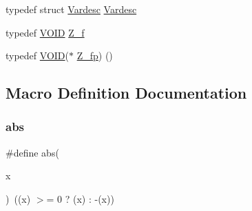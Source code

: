 \begin{DoxyCompactItemize}
\item 
typedef struct \hyperlink{struct_vardesc}{Vardesc} \hyperlink{dependencies_2third-party_2clapack_23_82_81_2_i_n_c_l_u_d_e_2f2c_8h_a6a5a1e20b9e8f87521f7629f97731e4f}{Vardesc}
\item 
typedef \hyperlink{include_2f2c_8h_a7f319bfc2492a2136964194204e7a8cf}{V\+O\+ID} \hyperlink{dependencies_2third-party_2clapack_23_82_81_2_i_n_c_l_u_d_e_2f2c_8h_a79ffb40adc43a2a6473eaacdb4a37718}{Z\+\_\+f}
\item 
typedef \hyperlink{include_2f2c_8h_a7f319bfc2492a2136964194204e7a8cf}{V\+O\+ID}($\ast$ \hyperlink{dependencies_2third-party_2clapack_23_82_81_2_i_n_c_l_u_d_e_2f2c_8h_a60ce564dff50dfd7e9cc06ef57093e4d}{Z\+\_\+fp}) ()
\end{DoxyCompactItemize}


\subsection{Macro Definition Documentation}
\mbox{\label{dependencies_2third-party_2clapack_23_82_81_2_i_n_c_l_u_d_e_2f2c_8h_a3aa069ac3980707dae1e0530f50d59e4}} 
\subsubsection{\texorpdfstring{abs}{abs}}
{\footnotesize\ttfamily \#define abs(\begin{DoxyParamCaption}\item[{}]{x }\end{DoxyParamCaption})~((x) $>$= 0 ? (x) \+: -\/(x))}

\mbox{\label{dependencies_2third-party_2clapack_23_82_81_2_i_n_c_l_u_d_e_2f2c_8h_a84cfa496aaa996263f890eef454c3b42}} 
